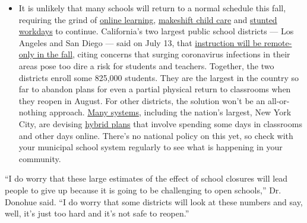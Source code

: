 \begin{itemize}
  \begin{itemize}
  \tightlist
  \item
    It is unlikely that many schools will return to a normal schedule
    this fall, requiring the grind of
    \href{https://www.nytimes3xbfgragh.onion/2020/06/05/us/coronavirus-education-lost-learning.html?action=click\&pgtype=Article\&state=default\&region=MAIN_CONTENT_3\&context=storylines_faq}{online
    learning},
    \href{https://www.nytimes3xbfgragh.onion/2020/05/29/us/coronavirus-child-care-centers.html?action=click\&pgtype=Article\&state=default\&region=MAIN_CONTENT_3\&context=storylines_faq}{makeshift
    child care} and
    \href{https://www.nytimes3xbfgragh.onion/2020/06/03/business/economy/coronavirus-working-women.html?action=click\&pgtype=Article\&state=default\&region=MAIN_CONTENT_3\&context=storylines_faq}{stunted
    workdays} to continue. California's two largest public school
    districts --- Los Angeles and San Diego --- said on July 13, that
    \href{https://www.nytimes3xbfgragh.onion/2020/07/13/us/lausd-san-diego-school-reopening.html?action=click\&pgtype=Article\&state=default\&region=MAIN_CONTENT_3\&context=storylines_faq}{instruction
    will be remote-only in the fall}, citing concerns that surging
    coronavirus infections in their areas pose too dire a risk for
    students and teachers. Together, the two districts enroll some
    825,000 students. They are the largest in the country so far to
    abandon plans for even a partial physical return to classrooms when
    they reopen in August. For other districts, the solution won't be an
    all-or-nothing approach.
    \href{https://bioethics.jhu.edu/research-and-outreach/projects/eschool-initiative/school-policy-tracker/}{Many
    systems}, including the nation's largest, New York City, are
    devising
    \href{https://www.nytimes3xbfgragh.onion/2020/06/26/us/coronavirus-schools-reopen-fall.html?action=click\&pgtype=Article\&state=default\&region=MAIN_CONTENT_3\&context=storylines_faq}{hybrid
    plans} that involve spending some days in classrooms and other days
    online. There's no national policy on this yet, so check with your
    municipal school system regularly to see what is happening in your
    community.
  \end{itemize}
\end{itemize}

``I do worry that these large estimates of the effect of school closures
will lead people to give up because it is going to be challenging to
open schools,'' Dr. Donohue said. ``I do worry that some districts will
look at these numbers and say, well, it's just too hard and it's not
safe to reopen.''

